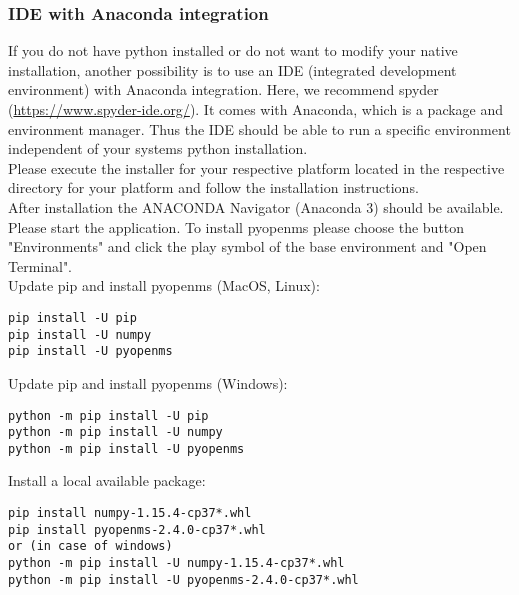 {\subsubsection{IDE with Anaconda integration}
If you do not have python installed or do not want to modify your native installation, another possibility is to use an IDE (integrated development environment) with Anaconda integration. Here, we recommend spyder (\url{https://www.spyder-ide.org/}). It comes with Anaconda, which is a package and environment manager. Thus the IDE should be able to run a specific environment independent of your systems python installation. \\

\noindent Please execute the installer for your respective platform located in the respective directory for your platform and follow the installation instructions. \\

\noindent After installation the ANACONDA Navigator (Anaconda 3) should be available. Please start the application. To install pyopenms please choose the button "Environments" and click the play symbol of the base environment and "Open Terminal". \\

\noindent  Update pip and install pyopenms (MacOS, Linux):
\begin{listing}
\begin{verbatim}
pip install -U pip
pip install -U numpy
pip install -U pyopenms
\end{verbatim}
\end{listing}

\noindent  Update pip and install pyopenms (Windows):
\begin{listing}
\begin{verbatim}
python -m pip install -U pip
python -m pip install -U numpy
python -m pip install -U pyopenms
\end{verbatim}
\end{listing}

\noindent Install a local available package:
\begin{listing}
\begin{verbatim}
pip install numpy-1.15.4-cp37*.whl
pip install pyopenms-2.4.0-cp37*.whl
or (in case of windows)
python -m pip install -U numpy-1.15.4-cp37*.whl
python -m pip install -U pyopenms-2.4.0-cp37*.whl
\end{verbatim}
\end{listing}

}
